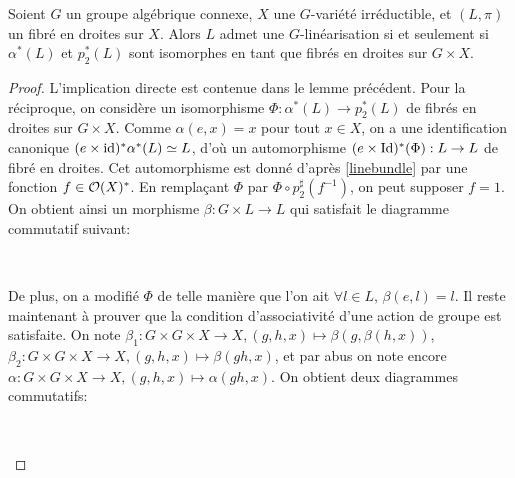 \begin{lem}\label{existenceGLin}
Soient $G$ un groupe algébrique connexe, $X$ une $G$-variété irréductible, et $(L,\pi)$ un fibré en droites sur $X$. Alors $L$ admet une $G$-linéarisation si et seulement si $\alpha^*(L)$ et $p_2^*(L)$ sont isomorphes en tant que fibrés en droites sur $G\times X$.
\end{lem}
\begin{proof}
L'implication directe est contenue dans le lemme précédent. Pour la réciproque, on considère un isomorphisme $\Phi:\alpha^*(L)\rightarrow p_2^*(L)$ de fibrés en droites sur $G\times X$. Comme $\alpha(e,x)=x$ pour tout $x\in X$, on a une identification canonique $(e\times \operatorname{id})^*\alpha^*(L)\simeq L$, d'où un automorphisme $(e\times \mathrm{Id})^*(\Phi):L\rightarrow L$ de fibré en droites. Cet automorphisme est donné d'après \ref{linebundle} par une fonction $f\in \mathcal{O}(X)^*$. En remplaçant $\Phi$ par $\Phi\circ p_2^\sharp(f^{-1})$, on peut supposer $f=1$. On obtient ainsi un morphisme  $\beta: G\times L \rightarrow L$ qui satisfait le diagramme commutatif suivant:
	\begin{center}
	\\
	\end{center}
De plus, on a modifié $\Phi$ de telle manière que l'on ait $\forall l\in L,\,\beta(e,l)=l$. Il reste maintenant à prouver que la condition d'associativité d'une action de groupe est satisfaite. On note $\beta_1:G\times G\times X\rightarrow X, (g,h,x)\mapsto \beta(g,\beta(h, x))$, $\beta_2:G\times G\times X\rightarrow X, (g,h,x)\mapsto \beta(gh, x)$, et par abus on note encore $\alpha:G\times G\times X\rightarrow X, (g,h,x)\mapsto \alpha(gh, x)$. On obtient deux diagrammes commutatifs:
	\begin{center}
	\,\,\,\,\,\,\,\,\,\,\,\,
\end{center}
\end{proof}
